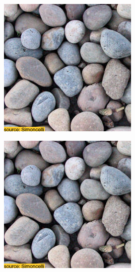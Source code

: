 \begin{figure}[]
\begin{subfigure}{\textwidth}
        \begin{subfigure}{0.24\textwidth}
            \centering
            \includegraphics[width=\textwidth]{images/04-experiment01/pebbles/target.jpg}
            \caption*{}
        \end{subfigure}
        \hfill
        \begin{subfigure}{0.24\textwidth}
            \centering
            \includegraphics[width=\textwidth]{images/04-experiment01/pebbles/pebbles_bg.jpg}

\end{subfigure}
\end{subfigure}
\end{figure}
